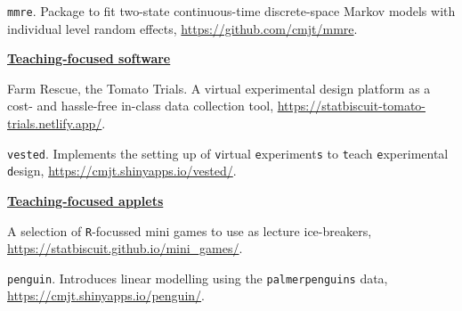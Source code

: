 \documentclass[10pt,a4paper]{moderncv}
\begin{document}
\vspace{-3pt}

\texttt{mmre}. Package to fit two-state continuous-time discrete-space Markov models with individual level random effects, \url{https://github.com/cmjt/mmre}.\\






\vspace{2pt}

\underline{\textbf{Teaching-focused software}}\\
\vspace{-3pt}

Farm Rescue, the Tomato Trials. A virtual experimental design platform as a cost- and hassle-free in-class data collection tool, \url{https://statbiscuit-tomato-trials.netlify.app/}.\\

\vspace{-3pt}

\texttt{vested}. Implements the setting up of \texttt{v}irtual \texttt{e}xperiment\texttt{s} to \texttt{t}each \texttt{e}xperimental \texttt{d}esign, \url{https://cmjt.shinyapps.io/vested/}.\\

\vspace{2pt}

\underline{\textbf{Teaching-focused applets}}\\
\vspace{-3pt}

A selection of \texttt{R}-focussed mini games to use as lecture ice-breakers, \url{https://statbiscuit.github.io/mini_games/}.\\

\vspace{-3pt}

\texttt{penguin}. Introduces linear modelling using the \texttt{palmerpenguins} data, \url{https://cmjt.shinyapps.io/penguin/}.\\
\end{document}
